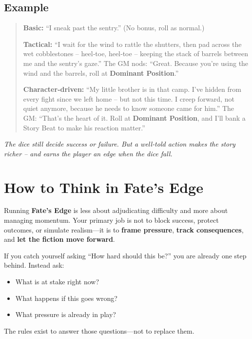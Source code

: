 \begin{tcolorbox}
\subsection*{Example}
\begin{quote}
\textbf{Basic:} “I sneak past the sentry.” (No bonus, roll as normal.)

\textbf{Tactical:} “I wait for the wind to rattle the shutters, then pad across
the wet cobblestones – heel‑toe, heel‑toe – keeping the stack of barrels between
me and the sentry’s gaze.”  
The GM nods: “Great. Because you’re using the wind and the barrels, roll at
\textbf{Dominant Position}.”

\textbf{Character‑driven:} “My little brother is in that camp. I’ve hidden from
every fight since we left home – but not this time. I creep forward, not quiet
anymore, because he needs to know someone came for him.”  
The GM: “That’s the heart of it. Roll at \textbf{Dominant Position}, and I’ll
bank a Story Beat to make his reaction matter.”
\end{quote}

\noindent
\textit{The dice still decide success or failure. But a well‑told action makes
the story richer – and earns the player an edge when the dice fall.}
\end{tcolorbox}

\section{How to Think in Fate's Edge}
\label{sec:gm-mindset}

Running \textbf{Fate's Edge} is less about adjudicating difficulty and more about managing momentum.  
Your primary job is not to block success, protect outcomes, or simulate realism—it is to \textbf{frame pressure}, \textbf{track consequences}, and \textbf{let the fiction move forward}.

If you catch yourself asking “How hard should this be?” you are already one step behind. Instead ask:
\begin{itemize}
\item What is at stake right now?
\item What happens if this goes wrong?
\item What pressure is already in play?
\end{itemize}
The rules exist to answer those questions—not to replace them.

